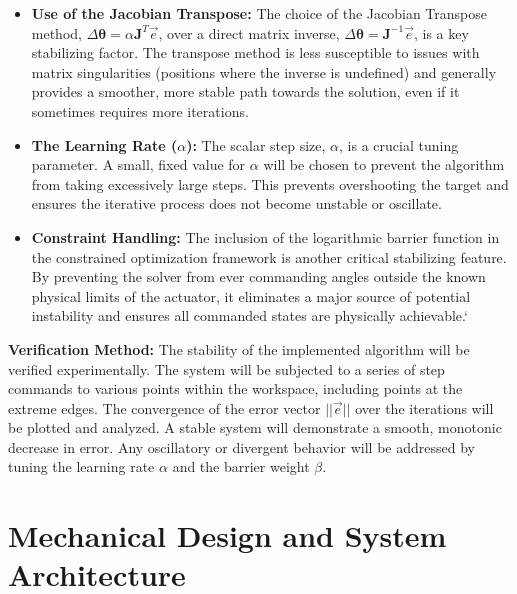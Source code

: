 \documentclass[12pt]{article}
\begin{document}
\begin{itemize}
\item \textbf{Use of the Jacobian Transpose:} The choice of the Jacobian Transpose method, \(\Delta\boldsymbol{\theta} = \alpha \mathbf{J}^T \vec{e}\), over a direct matrix inverse, \(\Delta\boldsymbol{\theta} = \mathbf{J}^{-1} \vec{e}\), is a key stabilizing factor. The transpose method is less susceptible to issues with matrix singularities (positions where the inverse is undefined) and generally provides a smoother, more stable path towards the solution, even if it sometimes requires more iterations.

\item \textbf{The Learning Rate (\(\alpha\)):} The scalar step size, \(\alpha\), is a crucial tuning parameter. A small, fixed value for \(\alpha\) will be chosen to prevent the algorithm from taking excessively large steps. This prevents overshooting the target and ensures the iterative process does not become unstable or oscillate.

\item \textbf{Constraint Handling:} The inclusion of the logarithmic barrier function in the constrained optimization framework is another critical stabilizing feature. By preventing the solver from ever commanding angles outside the known physical limits of the actuator, it eliminates a major source of potential instability and ensures all commanded states are physically achievable.`

  

\end{itemize}

\textbf{Verification Method:}
The stability of the implemented algorithm will be verified experimentally. The system will be subjected to a series of step commands to various points within the workspace, including points at the extreme edges. The convergence of the error vector \(||\vec{e}||\) over the iterations will be plotted and analyzed. A stable system will demonstrate a smooth, monotonic decrease in error. Any oscillatory or divergent behavior will be addressed by tuning the learning rate \(\alpha\) and the barrier weight \(\beta\).
\newpage


\section{Mechanical Design and System Architecture}
\end{document}
